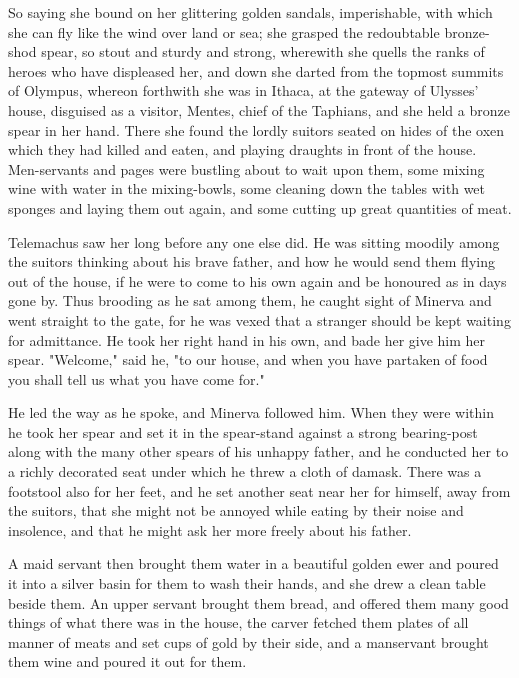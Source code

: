 So saying she bound on her glittering golden sandals, imperishable, with which
she can fly like the wind over land or sea; she grasped the redoubtable
bronze-shod spear, so stout and sturdy and strong, wherewith she quells the
ranks of heroes who have displeased her, and down she darted from the topmost
summits of Olympus, whereon forthwith she was in Ithaca, at the gateway of
Ulysses' house, disguised as a visitor, Mentes, chief of the Taphians, and
she held a bronze spear in her hand. There she found the lordly suitors seated
on hides of the oxen which they had killed and eaten, and playing draughts in
front of the house. Men-servants and pages were bustling about to wait upon
them, some mixing wine with water in the mixing-bowls, some cleaning down the
tables with wet sponges and laying them out again, and some cutting up great
quantities of meat.

Telemachus saw her long before any one else did. He was sitting moodily among
the suitors thinking about his brave father, and how he would send them flying
out of the house, if he were to come to his own again and be honoured as in
days gone by. Thus brooding as he sat among them, he caught sight of Minerva
and went straight to the gate, for he was vexed that a stranger should be kept
waiting for admittance. He took her right hand in his own, and bade her give
him her spear. "Welcome," said he, "to our house, and when you have partaken
of food you shall tell us what you have come for."

He led the way as he spoke, and Minerva followed him. When they were within he
took her spear and set it in the spear-stand against a strong bearing-post
along with the many other spears of his unhappy father, and he conducted her
to a richly decorated seat under which he threw a cloth of damask. There was a
footstool also for her feet, and he set another seat near her for himself,
away from the suitors, that she might not be annoyed while eating by their
noise and insolence, and that he might ask her more freely about his father.

A maid servant then brought them water in a beautiful golden ewer and poured
it into a silver basin for them to wash their hands, and she drew a clean
table beside them. An upper servant brought them bread, and offered them many
good things of what there was in the house, the carver fetched them plates of
 all manner of meats and set cups of gold by their side, and a manservant
 brought them wine and poured it out for them.
